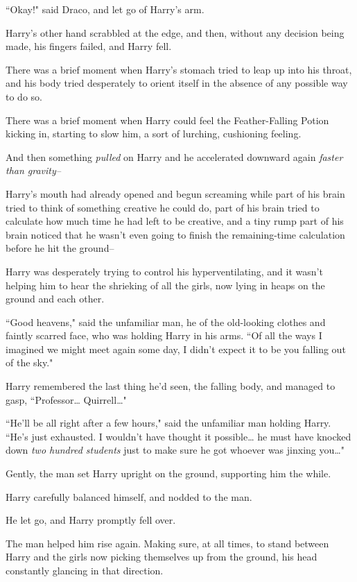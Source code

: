 ``Okay!" said Draco, and let go of Harry's arm.

Harry's other hand scrabbled at the edge, and then, without any decision being made, his fingers failed, and Harry fell.

There was a brief moment when Harry's stomach tried to leap up into his throat, and his body tried desperately to orient itself in the absence of any possible way to do so.

There was a brief moment when Harry could feel the Feather-Falling Potion kicking in, starting to slow him, a sort of lurching, cushioning feeling.

And then something \emph{pulled} on Harry and he accelerated downward again \emph{faster than gravity\---}

Harry's mouth had already opened and begun screaming while part of his brain tried to think of something creative he could do, part of his brain tried to calculate how much time he had left to be creative, and a tiny rump part of his brain noticed that he wasn't even going to finish the remaining-time calculation before he hit the ground\---

\later

Harry was desperately trying to control his hyperventilating, and it wasn't helping him to hear the shrieking of all the girls, now lying in heaps on the ground and each other.

``Good heavens," said the unfamiliar man, he of the old-looking clothes and faintly scarred face, who was holding Harry in his arms. ``Of all the ways I imagined we might meet again some day, I didn't expect it to be you falling out of the sky."

Harry remembered the last thing he'd seen, the falling body, and managed to gasp, ``Professor{\ldots} Quirrell{\ldots}"

``He'll be all right after a few hours," said the unfamiliar man holding Harry. ``He's just exhausted. I wouldn't have thought it possible{\ldots} he must have knocked down \emph{two hundred students} just to make sure he got whoever was jinxing you{\ldots}"

Gently, the man set Harry upright on the ground, supporting him the while.

Harry carefully balanced himself, and nodded to the man.

He let go, and Harry promptly fell over.

The man helped him rise again. Making sure, at all times, to stand between Harry and the girls now picking themselves up from the ground, his head constantly glancing in that direction.

